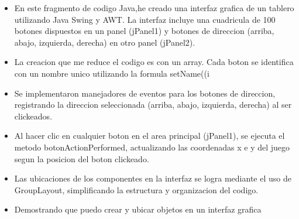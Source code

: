 \documentclass{article}
\begin{document}
\begin{itemize}
		
			\item En este fragmento de codigo Java,he creado una interfaz grafica de un tablero utilizando Java Swing y AWT. La interfaz incluye una cuadricula de 100 botones dispuestos en un panel (jPanel1) y botones de direccion (arriba, abajo, izquierda, derecha) en otro panel (jPanel2).
		\item La creacion que me reduce el codigo es con un array. Cada boton se identifica con un nombre unico utilizando la formula setName((i%
		\item Se implementaron manejadores de eventos para los botones de direccion, registrando la direccion seleccionada (arriba, abajo, izquierda, derecha) al ser clickeados.
		\item Al hacer clic en cualquier boton en el area principal (jPanel1), se ejecuta el metodo botonActionPerformed, actualizando las coordenadas x e y del juego segun la posicion del boton clickeado.
		\item Las ubicaciones de los componentes en la interfaz se logra mediante el uso de GroupLayout, simplificando la estructura y organizacion del codigo.
		\item Demostrando que puedo crear y ubicar objetos en un interfaz grafica
\end{itemize}
\end{document}
